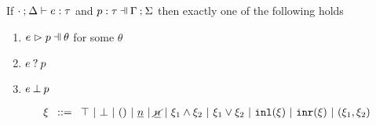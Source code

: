 \begin{lem}
  \label{lemma:match-determinism}
  If $\cdot \mathbin{;} \Delta \vdash e : \tau$ and $\hpattyp{p}{\tau}{\Gamma}{\Sigma}$ then exactly one of the following holds
  \begin{enumerate}
    \item $\hpatmatch{e}{p}{\theta}$ for some $\theta$
    \item $e \mathbin{?} p$
    \item $e \mathbin{\bot} p$
  \end{enumerate}
\end{lem}

\begin{figure}[t]
$\arraycolsep=4pt\begin{array}{lll}
\xi & ::= &
  \ctruth ~\vert~
  \cfalsity ~\vert~
  \cunit ~\vert~
  \cnum{n} ~\vert~
  \cnotnum{n} ~\vert~
  \cand{\xi_1}{\xi_2} ~\vert~
  \cor{\xi_1}{\xi_2} ~\vert~
  \cinl{\xi} ~\vert~
  \cinr{\xi} ~\vert~
  \cpair{\xi_1}{\xi_2}
\end{array}$
\end{figure}

